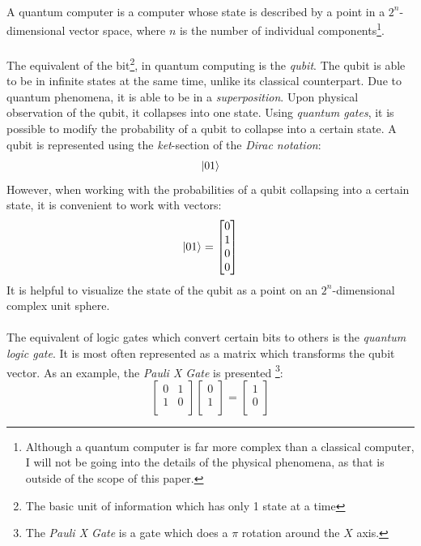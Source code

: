 \documentclass[a4paper, 10pt]{article}
\begin{document}
\paragraph*{}
A quantum computer is a computer whose state is described by a point in a $2^{n}$-dimensional vector space, where $n$ 
is the number of individual components\footnote{Although a quantum computer is far more complex than a classical 
computer, I will not be going into the details of the physical phenomena, as that is outside of the scope of this 
paper.}.

\paragraph*{}
The equivalent of the bit\footnote{The basic unit of information which has only 1 state at a time}, in quantum 
computing is the \textit{qubit}. The qubit is able to be in infinite states at the same time, unlike its classical 
counterpart. Due to quantum phenomena, it is able to be in a \textit{superposition}. Upon physical observation of the 
qubit, it collapses into one state. Using \textit{quantum gates}, it is possible to modify the probability of a qubit 
to collapse into a certain state. A qubit is represented using the \textit{ket}-section of the \textit{Dirac notation}:
$$\ket{01}$$
However, when working with the probabilities of a qubit collapsing into a certain state, it is convenient to work with 
vectors:
$$\ket{01} =
\begin{bmatrix}
0 \\
1 \\
0 \\
0 \\
\end{bmatrix}$$
It is helpful to visualize the state of the qubit as a point on an $2^{n}$-dimensional complex unit sphere.

\paragraph*{}
The equivalent of logic gates which convert certain bits to others is the \textit{quantum logic gate}. It is most often
 represented as a matrix which transforms the qubit vector. As an example, the \textit{Pauli X Gate} is presented
\footnote{The \textit{Pauli X Gate} is a gate which does a $\pi$ rotation around the $X$ axis.}:
$$
\begin{bmatrix}
0 & 1 \\
1 & 0 \\
\end{bmatrix}
\begin{bmatrix}
0 \\
1 \\
\end{bmatrix}
=
\begin{bmatrix}
1 \\
0 \\
\end{bmatrix}
$$
\end{document}
